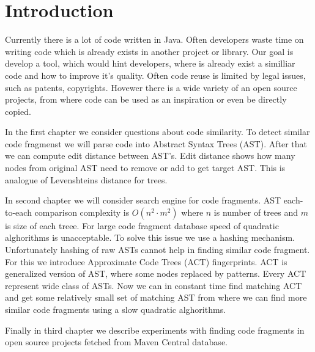 \section*{Introduction}
Currently there is a lot of code written in Java. Often developers waste time on
writing code which is already exists in another project or library. Our goal is
develop a tool, which would hint developers, where is already exist a similliar
code and how to improve it's quality. Often code reuse is limited by legal
issues, such as patents, copyrights. Hovewer there is a wide variety of an open source
projects, from where code can be used as an inspiration or even be directly
copied.

In the first chapter we consider questions about code similarity. To detect
similar code fragmenst we will parse code into Abstract Syntax Trees (AST). After that
we can compute edit distance between AST's. Edit distance shows how many nodes
from original AST need to remove or add to get target AST. This is analogue of
Levenshteins distance for trees.

In second chapter we will consider search engine for code fragments. AST
each-to-each comparison complexity is $O(n^2 \cdot m^2)$ where $n$ is number of
trees and $m$ is size of each treee. For large code fragment database speed of
quadratic alghorithms is unacceptable. To solve this issue we use a
hashing mechanism. Unfortunately hashing of raw ASTs cannot help in finding similar code
fragment. For this we introduce Approximate Code Trees (ACT) fingerprints.
ACT is generalized version of AST, where some nodes replaced by patterns. Every ACT
represent wide class of ASTs. Now we can in constant time find matching ACT and
get some relatively small set of matching AST from where we can find more
similar code fragments using a slow quadratic alghorithms.

Finally in third chapter we describe experiments with finding code fragments in
open source projects fetched from Maven Central database.
